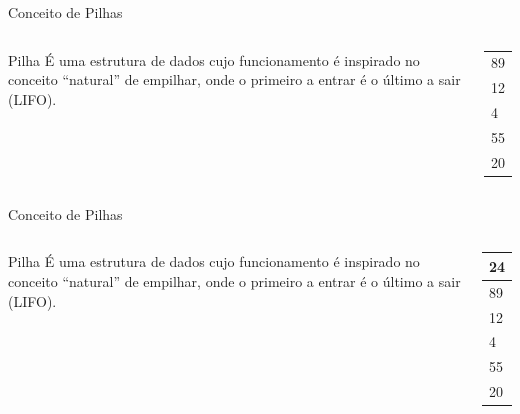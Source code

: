 \documentclass[12pt,table,xcolor={dvipsnames}]{beamer}
\begin{document}
\begin{frame}{Conceito de Pilhas}
\begin{columns}
\begin{block}{Pilha}
É uma estrutura de dados cujo funcionamento é inspirado no conceito “natural” de empilhar, onde o primeiro a entrar é o último a sair (LIFO).
\end{block}
\begin{center}
{
\begin{tabular}{ |p{.5cm}| }
\hline
 \\ \hline
89 \\ \hline
12 \\ \hline
4 \\ \hline
55 \\ \hline
20  \\ \hline
\end{tabular}
}
\end{center}
\end{columns}
\end{frame}

\begin{frame}{Conceito de Pilhas}
\begin{columns}
\begin{block}{Pilha}
É uma estrutura de dados cujo funcionamento é inspirado no conceito “natural” de empilhar, onde o primeiro a entrar é o último a sair (LIFO).
\end{block}
\begin{center}
{
\begin{tabular}{ |p{.5cm}| }
\hline
24 \\ \hline
89 \\ \hline
12 \\ \hline
4 \\ \hline
55 \\ \hline
20  \\ \hline
\end{tabular}
}
\end{center}
\end{columns}
\end{frame}
\end{document}
